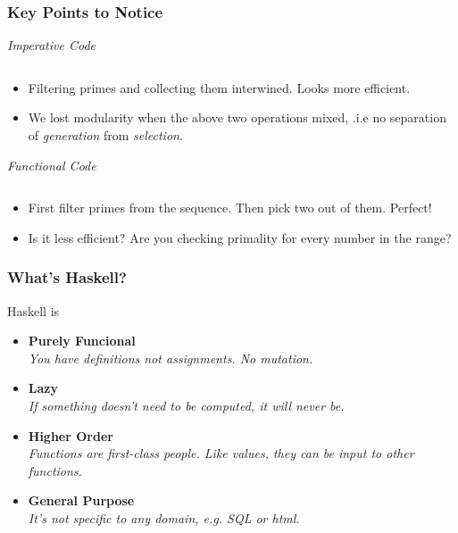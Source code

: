 \documentclass{beamer}
\begin{document}
\begin{frame}[fragile,t]
  \frametitle{Key Points to Notice}

  \begin{multicols}{2}
    \emph{Imperative Code}
    \inputminted[frame=lines,fontsize=\tiny]{c}{code/slides/primes.c}

    \begin{itemize}
    \item Filtering primes and collecting them interwined. Looks more efficient.
    \item We lost modularity when the above two operations mixed, .i.e no separation of
      \textit{generation} from \textit{selection}.
    \end{itemize}

    \columnbreak

    \emph{Functional Code}
    \inputminted[frame=lines,fontsize=\tiny]{haskell}{code/slides/Primes.hs}

    \begin{itemize}
    \item First filter primes from the sequence. Then pick two out of them. Perfect!
    \item Is it less efficient? Are you checking primality for every number in the range?
    \end{itemize}

  \end{multicols}
  \vfill

\end{frame}

\begin{frame}[t]
  \frametitle{What's Haskell?}

  Haskell is
  \begin{itemize}
  \item{\bf Purely Funcional} \\
    \textit{You have definitions not assignments. No mutation.}

  \item{\bf Lazy} \\
    \textit{If something doesn't need to be computed, it will never be.}

  \item{\bf Higher Order} \\
    \textit{Functions are first-class people. Like values, they can be input to other functions.}

  \item{\bf General Purpose} \\
    \textit{It's not specific to any domain, e.g. SQL or html.}

  \end{itemize}
\end{frame}
\end{document}
